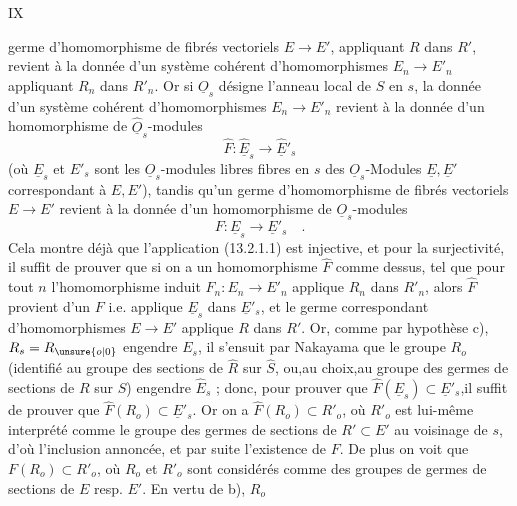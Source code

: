 \hfill IX

germe d'homomorphisme de fibrés vectoriels $E\longrightarrow E'$, appliquant $R$ dans $R'$, revient à la donnée d'un système cohérent d'homomorphismes $E_n\longrightarrow E'_n$ appliquant $R_n$ dans $R'_n$. Or si $\underline O_s$ désigne l'anneau local de $S$ en $s$, la donnée d'un système cohérent d'homomorphismes $E_n\longrightarrow E'_n$ revient à la donnée d'un homomorphisme de $\widehat{\underline O}_s$-modules
\[
 \hat F:\widehat{\underline E}_s\longrightarrow\widehat{\underline E}'_s
\]
(où $\underline E_s$ et $E'_s$ sont les $\underline O_s$-modules libres fibres en $s$ des $\underline O_s$-Modules $\underline E,\underline E'$ correspondant à $E,E'$), tandis qu'un germe d'homomorphisme de fibrés vectoriels $E\longrightarrow E'$ revient à la donnée d'un homomorphisme de $\underline O_s$-modules
\[
 F:\underline E_s\longrightarrow\underline E'_s\quad.
\]
Cela montre déjà que l'application (13.2.1.1) est injective, et pour la surjectivité, il suffit de prouver que si on a un homomorphisme $\hat F$ comme dessus, tel que pour tout $n$ l'homomorphisme induit $F_n:E_n\longrightarrow E'_n$ applique $R_n$ dans $R'_n$, alors $\hat F$ provient d'un $F$ i.e. applique $\underline E_s$ dans $\underline E'_s$, et le germe correspondant d'homomorphismes $E\longrightarrow E'$ applique $R$ dans $R'$. Or, comme par hypothèse c), $R_s=R_{\unsure{o|0}}$ engendre $E_s$, il s'ensuit par Nakayama que le groupe $R_o$ (identifié au groupe des sections de $\hat R$ sur $\hat S$, ou,au choix,au groupe des germes de sections de $R$ sur $S$) engendre $\hat E_s$ ; donc, pour prouver que $\hat F(\underline E_s)\subset\underline E'_s$,il suffit de prouver que $\hat F(R_o)\subset\underline E'_s$. Or on a $\hat F(R_o)\subset R'_o$, où $R'_o$ est lui-même interprété comme le groupe des germes de sections de $R'\subset E'$ au voisinage de $s$, d'où l'inclusion annoncée, et par suite l'existence de $F$. De plus on voit que $F(R_o)\subset R'_o$, où $R_o$ et $R'_o$ sont considérés comme des groupes de germes de sections de $E$ resp. $E'$. En vertu de b), $R_o$

